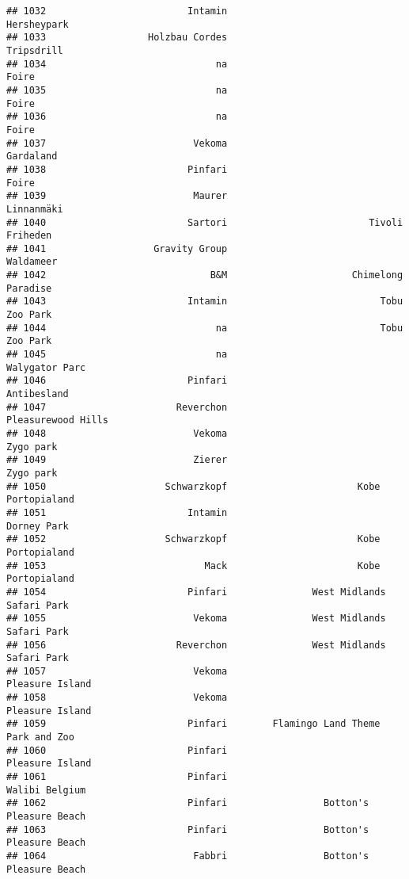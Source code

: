 \documentclass[
]{article}
\begin{document}
\begin{verbatim}
## 1032                         Intamin                             Hersheypark
## 1033                  Holzbau Cordes                              Tripsdrill
## 1034                              na                                   Foire
## 1035                              na                                   Foire
## 1036                              na                                   Foire
## 1037                          Vekoma                               Gardaland
## 1038                         Pinfari                                   Foire
## 1039                          Maurer                              Linnanmäki
## 1040                         Sartori                         Tivoli Friheden
## 1041                   Gravity Group                               Waldameer
## 1042                             B&M                      Chimelong Paradise
## 1043                         Intamin                           Tobu Zoo Park
## 1044                              na                           Tobu Zoo Park
## 1045                              na                          Walygator Parc
## 1046                         Pinfari                             Antibesland
## 1047                       Reverchon                      Pleasurewood Hills
## 1048                          Vekoma                               Zygo park
## 1049                          Zierer                               Zygo park
## 1050                     Schwarzkopf                       Kobe Portopialand
## 1051                         Intamin                             Dorney Park
## 1052                     Schwarzkopf                       Kobe Portopialand
## 1053                            Mack                       Kobe Portopialand
## 1054                         Pinfari               West Midlands Safari Park
## 1055                          Vekoma               West Midlands Safari Park
## 1056                       Reverchon               West Midlands Safari Park
## 1057                          Vekoma                         Pleasure Island
## 1058                          Vekoma                         Pleasure Island
## 1059                         Pinfari        Flamingo Land Theme Park and Zoo
## 1060                         Pinfari                         Pleasure Island
## 1061                         Pinfari                          Walibi Belgium
## 1062                         Pinfari                 Botton's Pleasure Beach
## 1063                         Pinfari                 Botton's Pleasure Beach
## 1064                          Fabbri                 Botton's Pleasure Beach

\end{verbatim}
\end{document}
